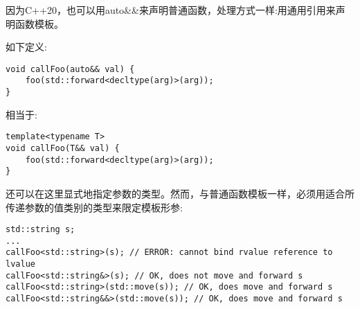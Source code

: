 因为C++20，也可以用auto\&\&来声明普通函数，处理方式一样:用通用引用来声明函数模板。\par

如下定义:\par

\begin{lstlisting}[caption={}]
void callFoo(auto&& val) {
	foo(std::forward<decltype(arg)>(arg));
}
\end{lstlisting}

相当于:\par

\begin{lstlisting}[caption={}]
template<typename T>
void callFoo(T&& val) {
	foo(std::forward<decltype(arg)>(arg));
}
\end{lstlisting}

还可以在这里显式地指定参数的类型。然而，与普通函数模板一样，必须用适合所传递参数的值类别的类型来限定模板形参:\par

\begin{lstlisting}[caption={}]
std::string s;
...
callFoo<std::string>(s); // ERROR: cannot bind rvalue reference to lvalue
callFoo<std::string&>(s); // OK, does not move and forward s
callFoo<std::string>(std::move(s)); // OK, does move and forward s
callFoo<std::string&&>(std::move(s)); // OK, does move and forward s
\end{lstlisting}






































